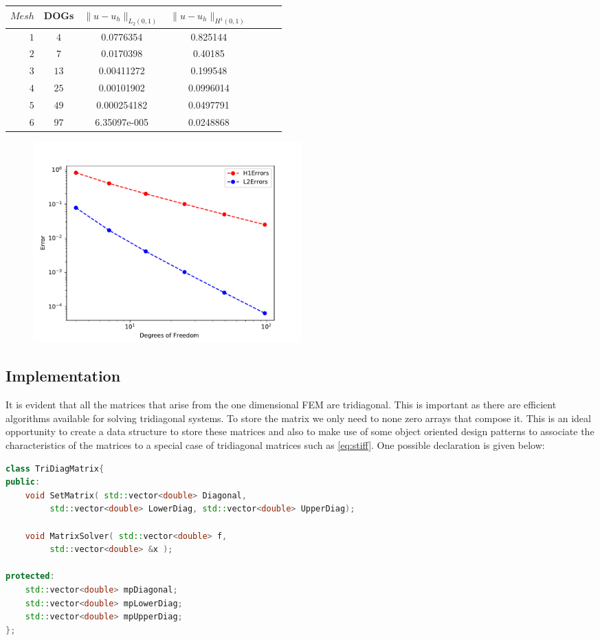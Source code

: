 \documentclass{uonmathreport}
\theoremstyle{definition}
\theoremstyle{problem}
\theoremstyle{theorem}
\begin{document}
\begin{center}
  \begin{tabular}{r|cccccc}
    $Mesh$   & DOGs & $\|u-u_h\|_{L_2(0,1)}$  & $\|u-u_h\|_{H^1(0,1)}$   \\ \hline
    $1$ & $4$ & 0.0776354  & 0.825144   \\
    $2$ & $7$ & 0.0170398  & 0.40185   \\
    $3$ & $13$ & 0.00411272  & 0.199548   \\
	$4$ & $25$ & 0.00101902  & 0.0996014 \\
    $5$ & $49$ & 0.000254182  & 0.0497791   \\
    $6$ & $97$ & 6.35097e-005  & 0.0248868  \\
  \end{tabular}
\end{center}

\begin{figure}[h]
   \includegraphics[width=0.5\textwidth]{EllipticPDE1Convergences.pdf}
     
 \label{fig:eliptic1}
\end{figure}

\subsection{Implementation} \label{subsec:Implementation1}

It is evident that all the matrices that arise from the one dimensional FEM are tridiagonal. This is important as there are efficient algorithms available for solving tridiagonal systems. To store the matrix we only need to  none zero arrays that compose it. This is an ideal opportunity to create a data structure to store these matrices and also to make use of some object oriented design patterns to associate the characteristics of the matrices to a special case of tridiagonal matrices such as \ref{eq:stiff}. One possible declaration is given below:

\begin{lstlisting}[language=C++]
class TriDiagMatrix{
public:
    void SetMatrix( std::vector<double> Diagonal,
         std::vector<double> LowerDiag, std::vector<double> UpperDiag);

    void MatrixSolver( std::vector<double> f,
         std::vector<double> &x );

protected:
    std::vector<double> mpDiagonal;
    std::vector<double> mpLowerDiag;
    std::vector<double> mpUpperDiag;
};
\end{lstlisting}
\end{document}
